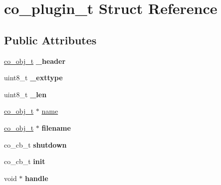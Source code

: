 \hypertarget{structco__plugin__t}{\section{co\-\_\-plugin\-\_\-t Struct Reference}
\label{structco__plugin__t}
}
\subsection*{Public Attributes}
\begin{DoxyCompactItemize}
\item 
\hypertarget{structco__plugin__t_ab0a2a4ad013802de52d8ba25148af417}{\hyperlink{structco__obj__t}{co\-\_\-obj\-\_\-t} {\bfseries \-\_\-header}}\label{structco__plugin__t_ab0a2a4ad013802de52d8ba25148af417}

\item 
\hypertarget{structco__plugin__t_ad3f325009c9a219de2d1840aa7893792}{uint8\-\_\-t {\bfseries \-\_\-exttype}}\label{structco__plugin__t_ad3f325009c9a219de2d1840aa7893792}

\item 
\hypertarget{structco__plugin__t_af4b68a1316b0bd48a57b989f2c5f524d}{uint8\-\_\-t {\bfseries \-\_\-len}}\label{structco__plugin__t_af4b68a1316b0bd48a57b989f2c5f524d}

\item 
\hyperlink{structco__obj__t}{co\-\_\-obj\-\_\-t} $\ast$ \hyperlink{structco__plugin__t_a6d404dac4735db73f208778f2eddd1e2}{name}
\item 
\hypertarget{structco__plugin__t_aa52a04c70682cf44cf948d89c7e88a10}{\hyperlink{structco__obj__t}{co\-\_\-obj\-\_\-t} $\ast$ {\bfseries filename}}\label{structco__plugin__t_aa52a04c70682cf44cf948d89c7e88a10}

\item 
\hypertarget{structco__plugin__t_a31c3e83b38d4bd779866e881f0efa256}{co\-\_\-cb\-\_\-t {\bfseries shutdown}}\label{structco__plugin__t_a31c3e83b38d4bd779866e881f0efa256}

\item 
\hypertarget{structco__plugin__t_a0c945cde5526c9f41bdbae97108f74c3}{co\-\_\-cb\-\_\-t {\bfseries init}}\label{structco__plugin__t_a0c945cde5526c9f41bdbae97108f74c3}

\item 
\hypertarget{structco__plugin__t_aee2e2a81038a12ee1146f5c8293ea491}{void $\ast$ {\bfseries handle}}\label{structco__plugin__t_aee2e2a81038a12ee1146f5c8293ea491}

\end{DoxyCompactItemize}



